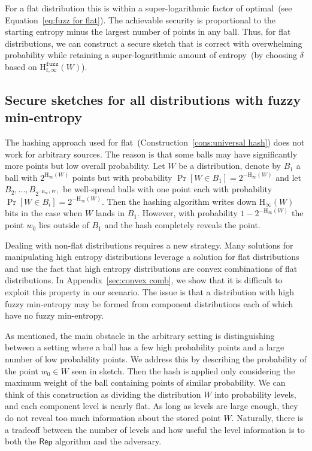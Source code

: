 \documentclass[11pt]{article}
\newcommand{\apref}[1]{\mbox{Appendix~\ref{#1}}}
\newcommand{\consref}[1]{\mbox{Construction~\ref{#1}}}
\newcommand{\class}[1]{{\ensuremath{\mathsf{#1}}}}
\newcommand{\rep}{\ensuremath{\class{Rep}}\xspace}
\newcommand{\Hoo}{\mathrm{H}_\infty}
\newcommand{\Hfuzz}{\mathrm{H}^{\mathtt{fuzz}}_{t,\infty}}
\begin{document}
For a flat distribution this is within a super-logarithmic factor of optimal~(see Equation~\eqref{eq:fuzz for flat}). The achievable security is proportional to the starting entropy minus the largest number of points in any ball.   Thus, for flat distributions, we can construct a secure sketch that is correct with overwhelming probability while retaining a super-logarithmic amount of entropy~(by choosing $\delta$ based on $\Hfuzz(W)$).  

\subsection{Secure sketches for all distributions with fuzzy min-entropy}
The hashing approach used for flat~(\consref{cons:universal hash}) does not work for arbitrary sources.  The reason is that some balls may have significantly more points but low overall probability.  Let $W$ be a distribution, denote by $B_1$ a ball with $2^{\Hoo(W)}$ points but with probability $\Pr[W\in B_1] =2^{-\Hoo(W)}$ and let $B_2,..., B_{2^{-\Hoo(W)}}$ be well-spread balls with one point each with probability $\Pr[W\in B_i] = 2^{-\Hoo(W)}$.  Then the hashing algorithm writes down $\Hoo(W)$ bits in the case when $W$ lands in $B_1$.  However, with probability $1-2^{-\Hoo(W)}$ the point $w_0$ lies outside of $B_1$ and the hash completely reveals the point.  

Dealing with non-flat distributions requires a new strategy. %
Many solutions for manipulating high entropy distributions leverage a solution for flat distributions and use the fact that high entropy distributions are convex combinations of flat distributions.  In \apref{sec:convex comb}, we show that it is difficult to exploit this property in our scenario.  The issue is that a distribution with high fuzzy min-entropy may be formed from component distributions each of which have no fuzzy min-entropy.

As mentioned, the main obstacle in the arbitrary setting is distinguishing between a setting where a ball has a few high probability points and a large number of low probability points.
We address this by describing the probability of the point $w_0\in W$ seen in sketch.  Then the hash is applied only considering the maximum weight of the ball containing points of similar probability.  We can think of this construction as dividing the distribution $W$ into probability levels, and each component level is nearly flat.  As long as levels are large enough, they do not reveal too much information about the stored point $W$.  Naturally, there is a tradeoff between the number of levels and how useful the level information is to both the \rep algorithm and the adversary.
\end{document}

